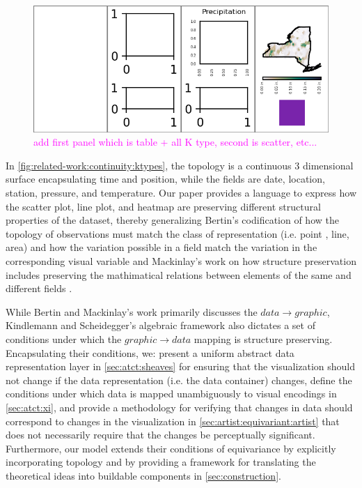 \documentclass[journal]{IEEEtran}
\newcommand{\note}[1]{\textcolor{magenta}{#1}}
\theoremstyle{definition}
\theoremstyle{remark}
\begin{document}
\begin{figure}[H]
  \includegraphics[width=1\columnwidth]{k_different_types.png}
  \caption{
  \note{add first panel which is table + all K type, second is scatter, etc...}
%
  \label{fig:related-work:continuity:ktypes}}
\end{figure}

 In \autoref{fig:related-work:continuity:ktypes}, the topology is a continuous 3 dimensional surface encapsulating time and position, while the fields are date, location, station, pressure, and temperature. Our paper provides a language to express how the scatter plot, line plot, and heatmap are preserving different structural properties of the dataset, thereby generalizing Bertin's codification of how the topology of observations must match the class of representation (i.e. point , line, area) and how the variation possible in a field match the variation in the corresponding visual variable \cite{bertinSemiologyGraphicsDiagrams2011} and Mackinlay's work on how structure preservation includes preserving the mathimatical relations between elements of the same and different fields \cite{mackinlayAutomatingDesignGraphical1986}.

While Bertin and Mackinlay's work primarily discusses the $data \rightarrow graphic$, Kindlemann and Scheidegger's algebraic framework \cite{kindlmannAlgebraicProcessVisualization2014} also dictates a set of conditions under which the $graphic \rightarrow data$  mapping is structure preserving. Encapsulating their conditions, we: present a uniform abstract data representation layer in \autoref{sec:atct:sheaves} for ensuring that the visualization should not change if the data representation (i.e. the data container) changes, define the conditions under which data is mapped unambiguously to visual encodings \cite{ziemkiewiczEmbeddingInformationVisualization2009} in \autoref{sec:atct:xi}, and provide a methodology for verifying that changes in data should correspond to changes in the visualization in \autoref{sec:artist:equivariant:artist} that does not necessarily require that the changes be perceptually significant. Furthermore, our model extends their conditions of equivariance by explicitly incorporating topology and by providing a framework for translating the theoretical ideas into buildable components in \autoref{sec:construction}.
\end{document}
